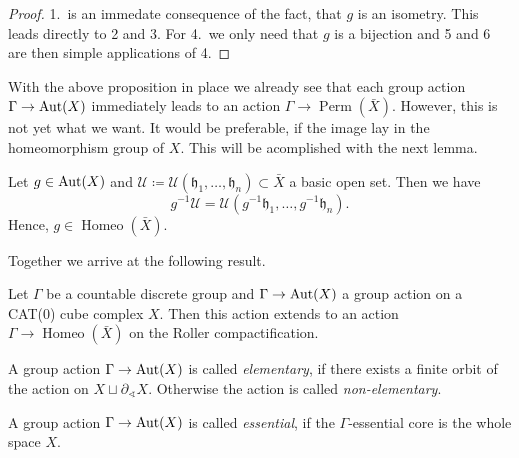 \begin{proof}
  1.\ is an immedate consequence of the fact, that \(g\) is an isometry. This leads directly to 2 and 3. For 4.\ we only need that \(g\) is a bijection and 5 and 6 are then simple applications of 4.
\end{proof}

With the above proposition in place we already see that each group action \(\Gamma \to \operatorname{Aut}(X)\) immediately leads to an action \(\Gamma \to \operatorname{Perm}(\bar X)\). However, this is not yet what we want. It would be preferable, if the image lay in the homeomorphism group of \(X\). This will be acomplished with the next lemma.

\begin{lemma}
  Let \(g \in \operatorname{Aut}(X)\) and \(\mathcal{U} \coloneqq \mathcal{U}(\mathfrak{h}_1, \dots, \mathfrak{h}_n) \subset \bar X\) a basic open set. Then we have
  \[
    g^{-1} \mathcal{U} = \mathcal{U}(g^{-1}\mathfrak{h}_1, \dots, g^{-1}\mathfrak{h}_n).
  \]
  Hence, \(g \in \operatorname{Homeo}(\bar X)\).
\end{lemma}

Together we arrive at the following result.

\begin{thm}
  \label{thm:roller-action}
  Let \(\Gamma\) be a countable discrete group and \(\Gamma \to \operatorname{Aut}(X)\) a group action on a CAT(0) cube complex \(X\). Then this action extends to an action \(\Gamma \to \operatorname{Homeo}(\bar X)\) on the Roller compactification.
\end{thm}

\begin{defin}
  A group action \(\Gamma \to \operatorname{Aut}(X)\) is called \emph{elementary}, if there exists a finite orbit of the action on \(X \sqcup \partial_{\sphericalangle}X\). Otherwise the action is called \emph{non-elementary}.
\end{defin}

\begin{defin}
  A group action \(\Gamma \to \operatorname{Aut}(X)\) is called \emph{essential}, if the \(\Gamma\)-essential core is the whole space \(X\).
\end{defin}


\begin{defin}
\end{defin}


